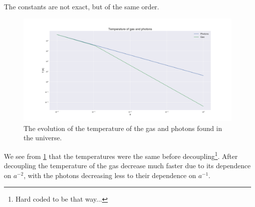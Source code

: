 \documentclass[a4paper,norsk, 10pt]{article}
\begin{document}
The constants are not exact, but of the same order.
\begin{figure}[!h]
\centering
\includegraphics[scale=0.25]{temp}
\caption{The evolution of the temperature of the gas and photons found in the universe.}\label{fig:temp}
\end{figure}

We see from \ref{fig:temp} that the temperatures were the same before decoupling\footnote{Hard coded to be that way...}. After decoupling the temperature of the gas decrease much faster due to its dependence on $a^{-2}$, with the photons decreasing less to their dependence on $a^{-1}$. 
\end{document}
